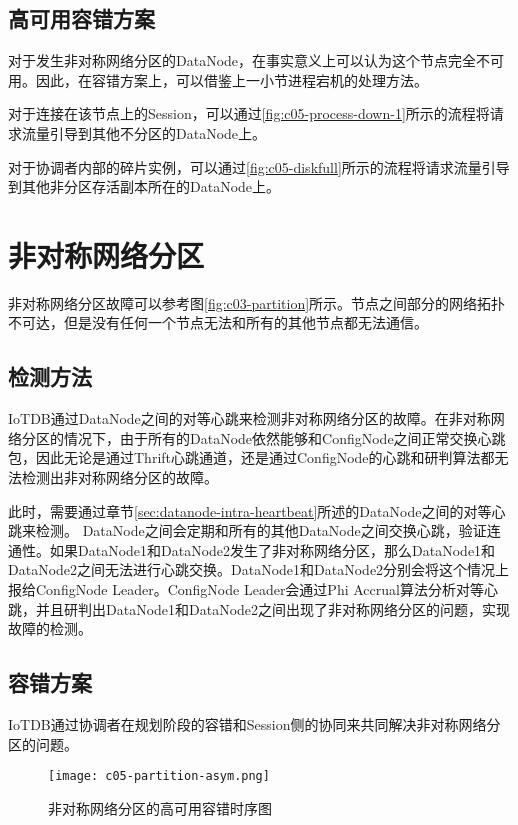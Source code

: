 \subsection{高可用容错方案}

对于发生非对称网络分区的DataNode，在事实意义上可以认为这个节点完全不可用。因此，在容错方案上，可以借鉴上一小节进程宕机的处理方法。

对于连接在该节点上的Session，可以通过\ref{fig:c05-process-down-1}所示的流程将请求流量引导到其他不分区的DataNode上。

对于协调者内部的碎片实例，可以通过\ref{fig:c05-diskfull}所示的流程将请求流量引导到其他非分区存活副本所在的DataNode上。


\section{非对称网络分区}

非对称网络分区故障可以参考图\ref{fig:c03-partition}所示。节点之间部分的网络拓扑不可达，但是没有任何一个节点无法和所有的其他节点都无法通信。

\subsection{检测方法}

IoTDB通过DataNode之间的对等心跳来检测非对称网络分区的故障。在非对称网络分区的情况下，由于所有的DataNode依然能够和ConfigNode之间正常交换心跳包，因此无论是通过Thrift心跳通道，还是通过ConfigNode的心跳和研判算法都无法检测出非对称网络分区的故障。

此时，需要通过章节\ref{sec:datanode-intra-heartbeat}所述的DataNode之间的对等心跳来检测。
DataNode之间会定期和所有的其他DataNode之间交换心跳，验证连通性。如果DataNode1和DataNode2发生了非对称网络分区，那么DataNode1和DataNode2之间无法进行心跳交换。DataNode1和DataNode2分别会将这个情况上报给ConfigNode Leader。ConfigNode Leader会通过Phi Accrual算法分析对等心跳，并且研判出DataNode1和DataNode2之间出现了非对称网络分区的问题，实现故障的检测。


\subsection{容错方案}

IoTDB通过协调者在规划阶段的容错和Session侧的协同来共同解决非对称网络分区的问题。

\begin{figure}
    \centering
    \texttt{[image: c05-partition-asym.png]}
    \caption{非对称网络分区的高可用容错时序图}
    \label{fig:c05-partition-asym}
\end{figure}

